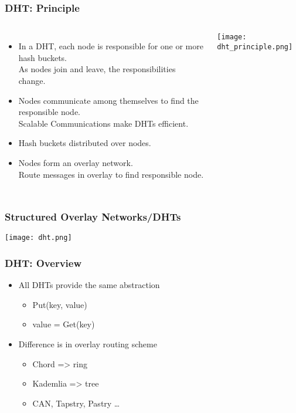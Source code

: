 \begin{frame}
    \frametitle{DHT: Principle}
    \begin{columns}
        \begin{itemize}
            \item In a DHT, each node is responsible for one or more hash buckets. \\
                As nodes join and leave, the responsibilities change.
            \item Nodes communicate among themselves to find the responsible node. \\
                Scalable Communications make DHTs efficient.
            \item Hash buckets distributed over nodes.
            \item Nodes form an \alert{overlay network}. \\
                Route messages in overlay to find responsible node.
        \end{itemize}
            \texttt{[image: dht\_principle.png]}
    \end{columns}
\end{frame}

\begin{frame}
    \frametitle{Structured Overlay Networks/DHTs}
    \texttt{[image: dht.png]}
\end{frame}

\begin{frame}
    \frametitle{DHT: Overview}
    \begin{itemize}
        \item All DHTs provide the same abstraction
        \begin{itemize}
            \item Put(key, value)
            \item value = Get(key)
        \end{itemize}
        \item Difference is in overlay routing scheme
        \begin{itemize}
            \item Chord => ring
            \item Kademlia => tree
            \item CAN, Tapstry, Pastry \ldots
        \end{itemize}
    \end{itemize}
\end{frame}

